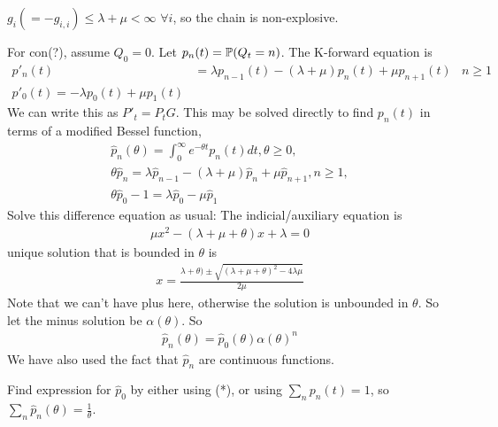 \documentclass[a4paper]{article}
\begin{document}
$g_i ( = -g_{i,i}) \leq \lambda+\mu < \infty$ $\forall i$, so the chain is non-explosive.

For con(?), assume $Q_0 =0 $. Let $p_n(t) =  \P(Q_t = n)$. The K-forward equation is 
\begin{equation*}
\begin{aligned}
p'_n(t) &= \lambda p_{n-1}(t) - (\lambda+\mu)p_n (t) + \mu p_{n+1}(t) & n \geq 1\\
p'_0(t) = -\lambda p_0(t) + \mu p_1(t)
\end{aligned}
\end{equation*}
We can write this as $P'_t = P_t G$. This may be solved directly to find $p_n(t)$ in terms of a modified Bessel function,
\begin{equation*}
\begin{aligned}
\hat{p}_n(\theta) = \int_0^\infty e^{-\theta t} p_n(t) dt, \theta \geq 0,\\
\theta \hat{p}_n = \lambda \hat{p}_{n-1} -(\lambda + \mu) \hat{p}_n + \mu \hat{p}_{n+1}, n \geq 1,\\
\theta \hat{p}_0 - 1 = \lambda \hat{p}_0 - \mu \hat{p}_1
\end{aligned}
\end{equation*}
Solve this difference equation as usual: The indicial/auxiliary equation is
\begin{equation*}
\begin{aligned}
\mu x^2 - (\lambda + \mu + \theta) x + \lambda = 0
\end{aligned}
\end{equation*}
unique solution that is bounded in $\theta$ is
\begin{equation*}
\begin{aligned}
x =\frac{\lambda+\theta) \pm \sqrt{(\lambda+\mu+\theta)^2 -4\lambda \mu}}{2\mu}
\end{aligned}
\end{equation*}
Note that we can't have plus here, otherwise the solution is unbounded in $\theta$. So let the minus solution be $\alpha(\theta)$. So
\begin{equation*}
\begin{aligned}
\hat{p}_n (\theta) = \hat{p}_0(\theta) \alpha(\theta)^n
\end{aligned}
\end{equation*}
We have also used the fact that $\hat{p}_n$ are continuous functions.

Find expression for $\hat{p}_0$ by either using (*), or using $\sum_n p_n(t) = 1$, so $\sum_n \hat{p}_n(\theta) = \frac{1}{\theta}$.
\end{document}
